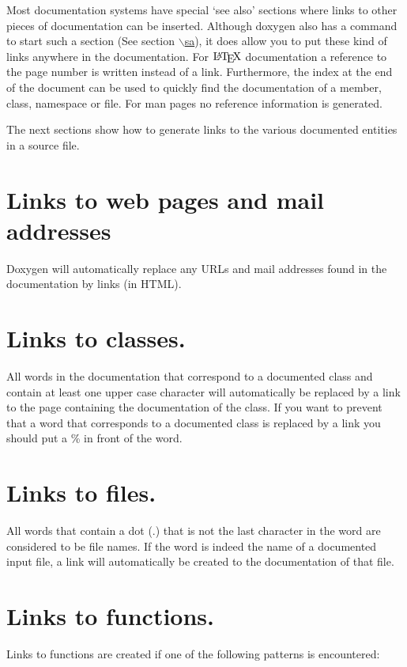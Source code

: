 Most documentation systems have special `see also' sections where links to other pieces of documentation can be inserted. Although doxygen also has a command to start such a section (See section \hyperlink{commands_cmdsa}{$\backslash$sa}), it does allow you to put these kind of links anywhere in the documentation. For $\mbox{\LaTeX}$ documentation a reference to the page number is written instead of a link. Furthermore, the index at the end of the document can be used to quickly find the documentation of a member, class, namespace or file. For man pages no reference information is generated.

The next sections show how to generate links to the various documented entities in a source file.\hypertarget{autolink_linkurl}{}\section{Links to web pages and mail addresses}\label{autolink_linkurl}
Doxygen will automatically replace any URLs and mail addresses found in the documentation by links (in HTML).\hypertarget{autolink_linkclass}{}\section{Links to classes.}\label{autolink_linkclass}
All words in the documentation that correspond to a documented class and contain at least one upper case character will automatically be replaced by a link to the page containing the documentation of the class. If you want to prevent that a word that corresponds to a documented class is replaced by a link you should put a \% in front of the word.\hypertarget{autolink_linkfile}{}\section{Links to files.}\label{autolink_linkfile}
All words that contain a dot ({\ttfamily .}) that is not the last character in the word are considered to be file names. If the word is indeed the name of a documented input file, a link will automatically be created to the documentation of that file.\hypertarget{autolink_linkfunc}{}\section{Links to functions.}\label{autolink_linkfunc}
Links to functions are created if one of the following patterns is encountered: 
